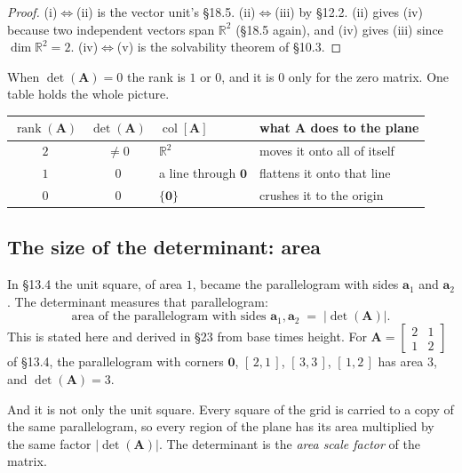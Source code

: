 \documentclass[11pt]{article}
\theoremstyle{plain}
\theoremstyle{definition}
\theoremstyle{remark}
\newcommand{\R}{\mathbb{R}}
\newcommand{\vc}[1]{\mathbf{#1}}        %
\newcommand{\mt}[1]{\mathbf{#1}}        %
\newcommand{\colsp}[1]{\operatorname{col}[#1]}
\DeclareMathOperator{\rank}{rank}
\begin{document}
\begin{proof}
(i)$\iff$(ii) is the vector unit's \S18.5. (ii)$\iff$(iii) by \S12.2. (ii)
gives (iv) because two independent vectors span $\R^{2}$ (\S18.5 again), and
(iv) gives (iii) since $\dim\R^{2}=2$. (iv)$\iff$(v) is the solvability
theorem of \S10.3.
\end{proof}

\noindent When $\det(\mt{A})=0$ the rank is $1$ or $0$, and it is $0$ only for
the zero matrix. One table holds the whole picture.

\begin{center}
\renewcommand{\arraystretch}{1.35}
\begin{tabular}{@{}c c l l@{}}
\toprule
$\rank(\mt{A})$ & $\det(\mt{A})$ & $\colsp{\mt{A}}$ & what $\mt{A}$ does to the plane \\
\midrule
$2$ & $\neq0$ & $\R^{2}$ & moves it onto all of itself \\
$1$ & $0$ & a line through $\vc{0}$ & flattens it onto that line \\
$0$ & $0$ & $\{\vc{0}\}$ & crushes it to the origin \\
\bottomrule
\end{tabular}
\end{center}

\subsection{The size of the determinant: area}
In \S13.4 the unit square, of area $1$, became the parallelogram with sides
$\vc{a}_1$ and $\vc{a}_2$. The determinant measures that parallelogram:
\[
  \text{area of the parallelogram with sides } \vc{a}_1,\vc{a}_2
  \;=\; |\det(\mt{A})| .
\]
This is stated here and derived in \S23 from base times height. For
$\mt{A}=\begin{bmatrix}2&1\\1&2\end{bmatrix}$ of \S13.4, the parallelogram with
corners $\vc{0}$, $[\,2,1\,]$, $[\,3,3\,]$, $[\,1,2\,]$ has area $3$, and
$\det(\mt{A})=3$.

And it is not only the unit square. Every square of the grid is carried to a
copy of the same parallelogram, so every region of the plane has its area
multiplied by the same factor $|\det(\mt{A})|$. The determinant is the
\emph{area scale factor} of the matrix.
\end{document}
